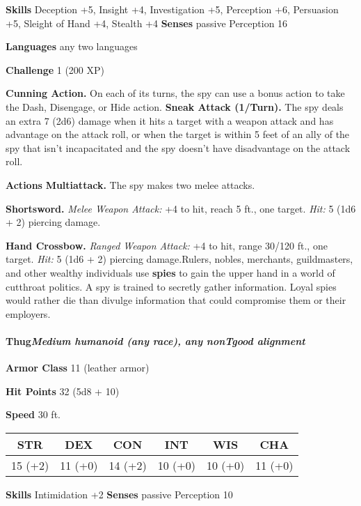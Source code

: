 \documentclass[
]{article}
\begin{document}
\textbf{Skills} Deception +5, Insight +4, Investigation +5, Perception
+6, Persuasion +5, Sleight of Hand +4, Stealth +4 \textbf{Senses}
passive Perception 16

\textbf{Languages} any two languages

\textbf{Challenge} 1 (200 XP)

\textbf{Cunning Action.} On each of its turns, the spy can use a bonus
action to take the Dash, Disengage, or Hide action. \textbf{Sneak Attack
(1/Turn).} The spy deals an extra 7 (2d6) damage when it hits a target
with a weapon attack and has advantage on the attack roll, or when the
target is within 5 feet of an ally of the spy that isn't incapacitated
and the spy doesn't have disadvantage on the attack roll.

\textbf{Actions} \textbf{Multiattack.} The spy makes two melee attacks.

\textbf{Shortsword.} \emph{Melee Weapon Attack:} +4 to hit, reach 5 ft.,
one target. \emph{Hit:} 5 (1d6 + 2) piercing damage.

\textbf{Hand Crossbow.} \emph{Ranged Weapon Attack:} +4 to hit, range
30/120 ft., one target. \emph{Hit:} 5 (1d6 + 2) piercing damage.Rulers,
nobles, merchants, guildmasters, and other wealthy individuals use
\textbf{spies} to gain the upper hand in a world of cutthroat politics.
A spy is trained to secretly gather information. Loyal spies would
rather die than divulge information that could compromise them or their
employers.

\hypertarget{thugmedium-humanoid-any-race-any-nontgood-alignment}{%
\paragraph{\texorpdfstring{Thug\emph{Medium humanoid (any race), any
nonTgood
alignment}}{ThugMedium humanoid (any race), any nonTgood alignment}}\label{thugmedium-humanoid-any-race-any-nontgood-alignment}}

\textbf{Armor Class} 11 (leather armor)

\textbf{Hit Points} 32 (5d8 + 10)

\textbf{Speed} 30 ft.

\begin{longtable}[]{@{}cccccc@{}}
\toprule
STR & DEX & CON & INT & WIS & CHA\tabularnewline
\midrule
\endhead
15 (+2) & 11 (+0) & 14 (+2) & 10 (+0) & 10 (+0) & 11 (+0)\tabularnewline
\bottomrule
\end{longtable}

\textbf{Skills} Intimidation +2 \textbf{Senses} passive Perception 10
\end{document}
